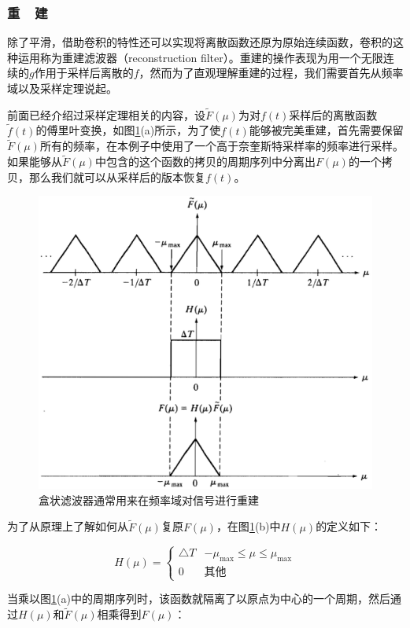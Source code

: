 \subsubsection{重~~建}
除了平滑，借助卷积的特性还可以实现将离散函数还原为原始连续函数，卷积的这种运用称为重建滤波器（reconstruction filter）。重建的操作表现为用一个无限连续的$g$作用于采样后离散的$f$，然而为了直观理解重建的过程，我们需要首先从频率域以及采样定理说起。

前面已经介绍过采样定理相关的内容，设$\tilde{F}(\mu)$为对$f(t)$采样后的离散函数$\tilde{f}(t)$的傅里叶变换，如图\ref{f:intro-reconstruction}(a)所示，为了使$f(t)$能够被完美重建，首先需要保留$\tilde{F}(\mu)$所有的频率，在本例子中使用了一个高于奈奎斯特采样率的频率进行采样。如果能够从$\tilde{F}(\mu)$中包含的这个函数的拷贝的周期序列中分离出$F(\mu)$的一个拷贝，那么我们就可以从采样后的版本恢复$f(t)$。

\begin{figure}
\sidecaption
	\includegraphics[width=.65\textwidth]{figures/intro/reconstruction}
	\caption{盒状滤波器通常用来在频率域对信号进行重建}
	\label{f:intro-reconstruction}
\end{figure}

为了从原理上了解如何从$\tilde{F}(\mu)$复原$F(\mu)$，在图\ref{f:intro-reconstruction}(b)中$H(\mu)$的定义如下：

\begin{equation}
	H(\mu)=\begin{cases}
		\triangle T & -\mu_{\max}\leq\mu\leq\mu_{\max}\\
		0           & \text{其他}
	\end{cases}
\end{equation}

\noindent 当乘以图\ref{f:intro-reconstruction}(a)中的周期序列时，该函数就隔离了以原点为中心的一个周期，然后通过$H(\mu)$和$\tilde{F}(\mu)$相乘得到$F(\mu)$：

